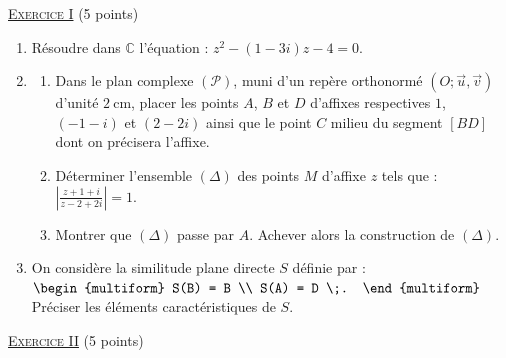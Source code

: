 \providecommand{\Courbe}{(\mathscr{C})}
\providecommand{\D}{(\mathscr{D})}
\providecommand{\Plan}{(\mathscr{P})}
\providecommand{\Ouv}{(O ; \vec{u} , \vec{v})}
\providecommand{\cm}{~\mathrm{cm}}
\providecommand{\dx}{~\mathrm{d}x}
\providecommand{\Arg}[1]{\mathrm{Arg}\left( #1 \right)}

\noindent \underline{\textsc{Exercice I}} (5 points) 
      \begin{enumerate}
            \item R\'esoudre dans $\mathbb{C}$ l'\'equation : $z^2 - (1-3i) z - 4 = 0$.
            \item \begin{enumerate}
                        \item Dans le plan complexe $\Plan$, muni d'un rep\`ere orthonorm\'e $\Ouv$ d'unit\'e $2\cm$,
                              placer les points $A$, $B$ et $D$ d'affixes respectives $1$, $(-1-i)$ et $(2-2i)$ 
                              ainsi que le point $C$ milieu du segment $[BD]$ dont on pr\'ecisera l'affixe.
                        \item D\'eterminer l'ensemble $(\Delta)$ des points $M$ d'affixe $z$ tels que :
                              $\left| \frac{z +1 +i}{z -2 + 2i} \right| = 1$.
                        \item Montrer que $(\Delta)$ passe par $A$. Achever alors la construction de $(\Delta)$.
                  \end{enumerate}
            \item On consid\`ere la similitude plane directe $S$ d\'efinie par : 
                  $
                        \begin{multiform}
                              S(B) = B \\ S(A) = D \;.
                        \end{multiform}
                  $
                  Pr\'eciser les \'el\'ements caract\'eristiques de $S$.
      \end{enumerate}
\noindent \underline{\textsc{Exercice II}} (5 points) 
